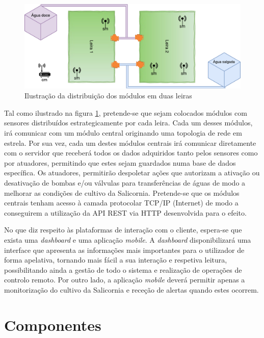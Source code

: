 \begin{figure}[!htb]
	\centering
	\includegraphics[scale=0.63]{esquemas/leiras-comm-geral.pdf}
	\caption{Ilustração da distribuição dos módulos em duas leiras}
	\label{leira}
\end{figure}


Tal como ilustrado na figura \ref{leira}, pretende-se que sejam colocados módulos com sensores distribuídos estrategicamente por cada leira. Cada um desses módulos, irá comunicar com um módulo central originando uma topologia de rede em estrela.  Por sua vez, cada um destes módulos centrais irá comunicar diretamente com o servidor que receberá todos os dados adquiridos tanto pelos sensores como por atuadores, permitindo que estes sejam guardados numa base de dados específica. Os atuadores, permitirão despoletar ações que autorizam a ativação ou desativação de bombas e/ou válvulas para transferências de águas de modo a melhorar as condições de cultivo da Salicornia. 
Pretende-se que os módulos centrais tenham acesso à camada protocolar \acs{TCP}/\acs{IP} (Internet) de modo a conseguirem a utilização da \acs{API} \acs{REST} via \ac{HTTP} desenvolvida para o efeito. 

No que diz respeito às plataformas de interação com o cliente, espera-se que exista uma \textit{dashboard} e uma aplicação \textit{mobile}. A \textit{dashboard} disponibilizará  uma interface que apresenta as informações mais importantes para o utilizador de forma apelativa, tornando mais fácil a sua interação e respetiva leitura, possibilitando ainda a gestão de todo o sistema e realização de operações de controlo remoto. Por outro lado, a aplicação \textit{mobile} deverá permitir apenas a monitorização do cultivo da Salicornia e receção de alertas quando estes ocorrem.




\section{Componentes}

